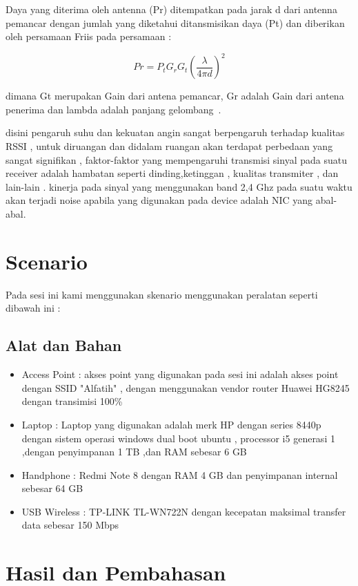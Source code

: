\documentclass[conference]{IEEEtran}
\begin{document}
Daya yang diterima oleh antenna (Pr) ditempatkan pada jarak d
dari antenna pemancar dengan jumlah yang diketahui
ditansmisikan daya (Pt) dan diberikan oleh
persamaan Friis pada persamaan :

\begin{equation}
    Pr = P_t G_r G_t 
    \left( 
        \frac{\lambda}{4 \pi d}
    \right) ^2
\end{equation}

dimana Gt merupakan Gain dari antena pemancar, Gr
adalah Gain dari antena penerima  dan lambda adalah
panjang gelombang~. \cite{puspitasari2014analisis}

disini pengaruh suhu dan kekuatan angin sangat berpengaruh terhadap kualitas RSSI ,
untuk diruangan dan didalam ruangan akan terdapat perbedaan yang sangat signifikan , faktor-faktor
yang mempengaruhi transmisi sinyal pada suatu receiver adalah hambatan seperti dinding,ketinggan , kualitas transmiter , dan lain-lain .
kinerja pada sinyal yang menggunakan band 2,4 Ghz pada suatu waktu akan terjadi noise apabila yang digunakan pada device adalah NIC yang abal-abal.

\section{Scenario}
Pada sesi ini kami menggunakan skenario menggunakan peralatan seperti dibawah ini :
\subsection{Alat dan Bahan}

\begin{itemize}
    \item Access Point : akses point yang digunakan pada sesi ini adalah akses point dengan SSID  "Alfatih" , dengan menggunakan vendor router Huawei HG8245 dengan transimisi 100\% 
    \item Laptop : Laptop yang digunakan adalah merk HP dengan series 8440p dengan sistem operasi windows dual boot ubuntu , processor i5 generasi 1 ,dengan penyimpanan 1 TB ,dan RAM sebesar 6 GB 
    \item Handphone : Redmi Note 8 dengan RAM 4 GB dan penyimpanan internal sebesar 64 GB 
    \item USB Wireless : TP-LINK TL-WN722N dengan kecepatan maksimal transfer data sebesar 150 Mbps
\end{itemize}



\section{Hasil dan Pembahasan}
\end{document}
